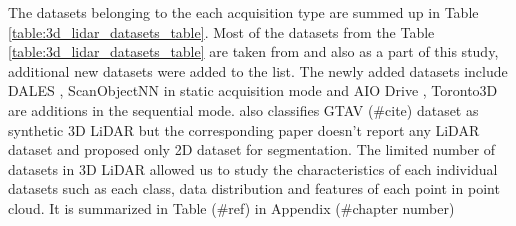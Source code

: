 The datasets belonging to the each acquisition type are summed up in  Table \ref{table:3d_lidar_datasets_table}.
Most of the datasets from the Table \ref{table:3d_lidar_datasets_table} are taken from \cite{survey3d} and also as a part of this study, additional new datasets were added to the list.
The newly added datasets include DALES \cite{varney2020dales}, ScanObjectNN \cite{scanobejctnn} in static acquisition mode and AIO Drive \cite{Weng2020_AIODrive}, Toronto3D \cite{tan2020toronto3d} are additions in the sequential mode.
\cite{survey3d} also classifies GTAV (\#cite) dataset as synthetic 3D LiDAR but the corresponding paper doesn't report any LiDAR dataset and proposed only 2D dataset for segmentation.
The limited number of datasets in 3D LiDAR allowed us to study the characteristics of each individual datasets such as each class, data distribution and features of each point in point cloud. 
It is summarized in Table (\#ref) in Appendix (\#chapter number)

